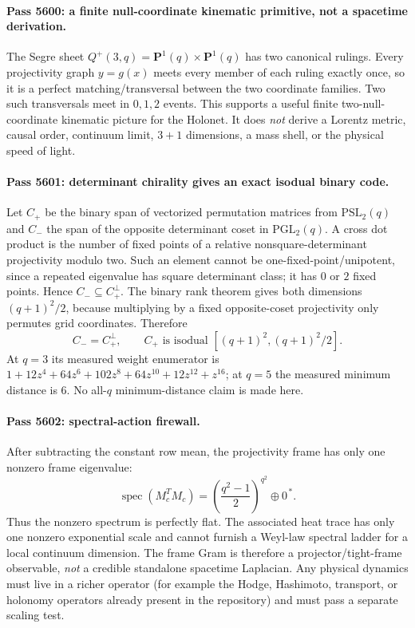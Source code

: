 \paragraph{Pass 5600: a finite null-coordinate kinematic primitive, not a
spacetime derivation.}
The Segre sheet $Q^+(3,q)=\mathbf P^1(q)\times\mathbf P^1(q)$ has two
canonical rulings.  Every projectivity graph $y=g(x)$ meets every member of
each ruling exactly once, so it is a perfect matching/transversal between the
two coordinate families.  Two such transversals meet in $0,1,2$ events.  This
supports a useful finite two-null-coordinate kinematic picture for the Holonet.
It does \emph{not} derive a Lorentz metric, causal order, continuum limit,
$3+1$ dimensions, a mass shell, or the physical speed of light.

\paragraph{Pass 5601: determinant chirality gives an exact isodual binary
code.}
Let $C_+$ be the binary span of vectorized permutation matrices from
$\mathrm{PSL}_2(q)$ and $C_-$ the span of the opposite determinant coset in
$\mathrm{PGL}_2(q)$.  A cross dot product is the number of fixed points of a
relative nonsquare-determinant projectivity modulo two.  Such an element cannot
be one-fixed-point/unipotent, since a repeated eigenvalue has square determinant
class; it has $0$ or $2$ fixed points.  Hence $C_-\subseteq C_+^\perp$.  The
binary rank theorem gives both dimensions $(q+1)^2/2$, because multiplying by a
fixed opposite-coset projectivity only permutes grid coordinates.  Therefore
\[
\boxed{C_-=C_+^\perp,}
\qquad
\boxed{C_+\text{ is isodual }[(q+1)^2,(q+1)^2/2].}
\]
At $q=3$ its measured weight enumerator is
$1+12z^4+64z^6+102z^8+64z^{10}+12z^{12}+z^{16}$; at $q=5$ the measured
minimum distance is $6$.  No all-$q$ minimum-distance claim is made here.

\paragraph{Pass 5602: spectral-action firewall.}
After subtracting the constant row mean, the projectivity frame has only one
nonzero frame eigenvalue:
\[
\boxed{\operatorname{spec}(M_c^TM_c)
 =\left(\frac{q^2-1}{2}\right)^{q^2}\oplus0^{\,*}.}
\]
Thus the nonzero spectrum is perfectly flat.  The associated heat trace has
only one nonzero exponential scale and cannot furnish a Weyl-law spectral
ladder for a local continuum dimension.  The frame Gram is therefore a
projector/tight-frame observable, \emph{not} a credible standalone spacetime
Laplacian.  Any physical dynamics must live in a richer operator (for example
the Hodge, Hashimoto, transport, or holonomy operators already present in the
repository) and must pass a separate scaling test.

